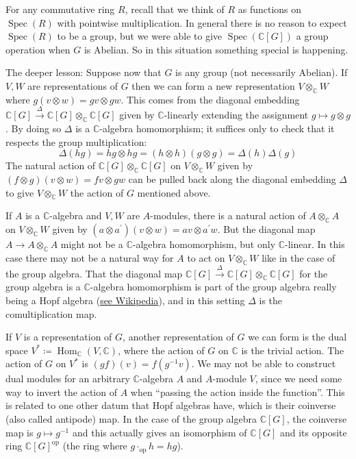 \documentclass[11pt,leqno]{article}
\theoremstyle{plain}
\theoremstyle{definition}
\numberwithin{equation}{section}
\numberwithin{lem}{section}
\DeclareMathOperator{\Hom}{Hom}
\DeclareMathOperator{\Spec}{Spec}
\renewcommand{\op}{\mathrm{op}} %
\begin{document}
For any commutative ring $R$, recall that we think of $R$ as functions on $\Spec(R)$ with pointwise multiplication. In general there is no reason to expect $\Spec(R)$ to be a group, but we were able to give $\Spec(\mathbb C[G])$ a group operation when $G$ is Abelian. So in this situation something special is happening. 

The deeper lesson: Suppose now that $G$ is any group (not necessarily Abelian). If $V,W$ are representations of $G$ then we can form a new representation $V\otimes_{\mathbb C}W$ where $g(v\otimes w) = gv\otimes gw$. This comes from the diagonal embedding $\mathbb C[G]\xrightarrow{\Delta}\mathbb C[G]\otimes_{\mathbb C} \mathbb C[G]$ given by $\mathbb C$-linearly extending the assignment $g\mapsto g\otimes g$. By doing so $\Delta$ is a $\mathbb C$-algebra homomorphism; it suffices only to check that it respects the group multiplication:
\[\Delta(hg) = hg\otimes hg = (h\otimes h)(g\otimes g) = \Delta(h)\Delta(g)\]
The natural action of $\mathbb C[G]\otimes_{\mathbb C} \mathbb C[G]$ on $V\otimes_{\mathbb C} W$ given by $(f\otimes g)(v\otimes w) = fv\otimes gw$ can be pulled back along the diagonal embedding $\Delta$ to give $V\otimes_{\mathbb C} W$ the action of $G$ mentioned above.

If $A$ is a $\mathbb C$-algebra and $V,W$ are $A$-modules, there is a natural action of $A\otimes_\mathbb CA$ on $V\otimes_{\mathbb C}W$ given by $(a\otimes a^\prime)(v\otimes w) = av\otimes a^\prime w$. But the diagonal map $A\to A\otimes_{\mathbb C}A$ might not be a $\mathbb C$-algebra homomorphism, but only $\mathbb C$-linear. In this case there may not be a natural way for $A$ to act on $V\otimes_{\mathbb C}W$ like in the case of the group algebra. That the diagonal map $\mathbb C[G]\xrightarrow{\Delta}\mathbb C[G]\otimes_{\mathbb C} \mathbb C[G]$ for the group algebra is a $\mathbb C$-algebra homomorphism is part of the group algebra really being a Hopf algebra (\href{https://en.wikipedia.org/wiki/Hopf_algebra}{see Wikipedia}), and in this setting $\Delta$ is the comultiplication map.

If $V$ is a representation of $G$, another representation of $G$ we can form is the dual space $V^\ast\coloneqq \Hom_{\mathbb C}(V,\mathbb C)$, where the action of $G$ on $\mathbb C$ is the trivial action. The action of $G$ on $V^\ast$ is $(gf)(v) = f(g^{-1}v)$. We may not be able to  construct dual modules for an arbitrary $\mathbb C$-algebra $A$ and $A$-module $V$, since we need some way to invert the action of $A$ when ``passing the action inside the function''. This is related to one other datum that Hopf algebras have, which is their coinverse (also called antipode) map. In the case of the group algebra $\mathbb C[G]$, the coinverse map is $g\mapsto g^{-1}$ and this actually gives an isomorphism of $\mathbb C[G]$ and its opposite ring $\mathbb C[G]^{\op}$ (the ring where $g\cdot_{\op}h = hg$).
\end{document}
